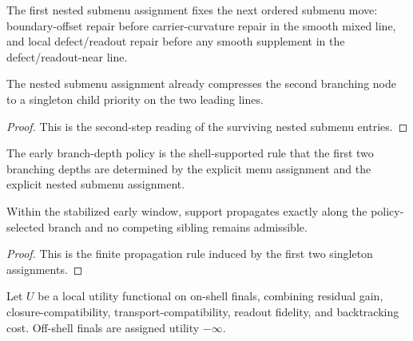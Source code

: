 \begin{definition}
\label{def:first-explicit-nested-submenu-assignment-after-the-two-leading-entries}
The first nested submenu assignment fixes the next ordered submenu move: boundary-offset repair before carrier-curvature repair in the smooth mixed line, and local defect/readout repair before any smooth supplement in the defect/readout-near line.
\end{definition}

\begin{proposition}
\label{prop:second-step-priority-readout-of-the-first-nested-submenu-assignment}
The nested submenu assignment already compresses the second branching node to a singleton child priority on the two leading lines.
\end{proposition}

\begin{proof}
This is the second-step reading of the surviving nested submenu entries.
\end{proof}

\begin{definition}
\label{def:first-shell-supported-branch-depth-policy}
The early branch-depth policy is the shell-supported rule that the first two branching depths are determined by the explicit menu assignment and the explicit nested submenu assignment.
\end{definition}

\begin{proposition}
\label{prop:early-depth-support-propagation-under-the-first-branch-depth-policy}
Within the stabilized early window, support propagates exactly along the policy-selected branch and no competing sibling remains admissible.
\end{proposition}

\begin{proof}
This is the finite propagation rule induced by the first two singleton assignments.
\end{proof}

\begin{definition}
\label{def:first-shell-compatible-local-utility-functional}
Let $U$ be a local utility functional on on-shell finals, combining residual gain, closure-compatibility, transport-compatibility, readout fidelity, and backtracking cost. Off-shell finals are assigned utility $-\infty$.
\end{definition}

